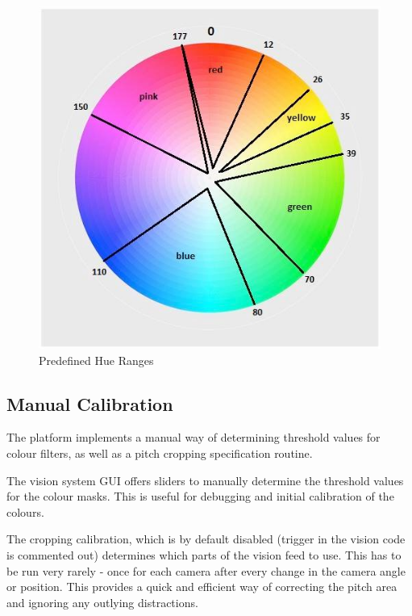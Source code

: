 \begin{figure}[h]
\centering
\includegraphics[scale=0.5]{vision_hue}
\caption{Predefined Hue Ranges}
\label{fig:hues}
\end{figure}

\subsection{Manual Calibration}
The platform implements a manual way of determining threshold values for colour filters, as well as a pitch cropping specification routine.

The vision system GUI offers sliders to manually determine the threshold values for the colour masks. This is useful for debugging and initial calibration of the colours.

The cropping calibration, which is by default disabled (trigger in the vision code is commented out) determines which parts of the vision feed to use. This has to be run very rarely - once for each camera after every change in the camera angle or position. This provides a quick and efficient way of correcting the pitch area and ignoring any outlying distractions.
